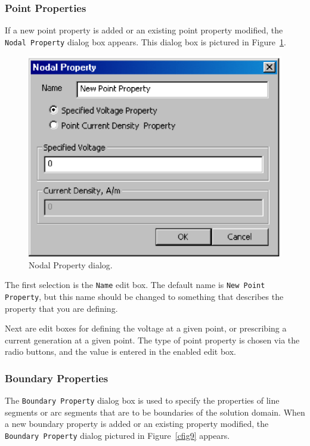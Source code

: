 \subsubsection{Point Properties}

If a new point property is added or an existing point property modified, the
\texttt{Nodal Property} dialog box appears. This dialog box is pictured in
Figure~\ref{cfig8}.

\begin{figure}[htbp]
\centerline{\includegraphics{cd2.ps}}
\caption{Nodal Property dialog.}
\label{cfig8}
\end{figure}

The first selection is the \texttt{Name} edit box. The default name
is {\tt New Point Property}, but this name should be changed to
something that describes the property that you are defining.

Next are edit boxes for defining the voltage at a given point, or
prescribing a current generation at a given point. The type of point
property is chosen via the radio buttons, and the value is entered in the
enabled edit box.

\subsubsection{Boundary Properties}

The \texttt{Boundary Property} dialog box is used to specify the
properties of line segments or arc segments that are to be
boundaries of the solution domain. When a new boundary property is
added or an existing property modified, the \texttt{Boundary
Property} dialog pictured in Figure~\ref{cfig9} appears.

